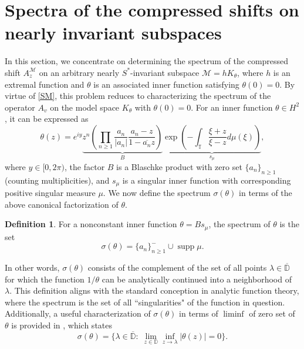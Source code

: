 \documentclass[12pt,reqno]{amsart}
\theoremstyle{definition}
\newtheorem{defn}[thm]{Definition}
\theoremstyle{remark}
\numberwithin{equation}{section}
\newcommand{\ol}{\overline}
\newcommand{\ma}{\mathcal}
\begin{document}
\section{Spectra   of the compressed shifts on nearly invariant subspaces}
In this section, we concentrate on determining the spectrum of the compressed shift $A_z^\ma{M}$ on an arbitrary nearly $S^*$-invariant subspace $\ma{M}=hK_\theta$, where  $h$ is an extremal function and $\theta$ is an associated inner function  satisfying $\theta(0)=0$. By virtue of \eqref{SM}, this problem reduces to characterizing the spectrum of the operator $A_v$ on the model space $K_\theta$ with $\theta(0)=0$.  For an inner function \( \theta\in H^2\), it can be expressed as
\[\theta(z) = e^{iy}
\underbrace{z^n
  \left( \prod_{n \geq 1} \frac{a_n}{|a_n|} \frac{a_n - z}{1 - \overline{a_n} z} \right)
}_{B}
\underbrace{
  \exp \left( -\int_{\mathbb{T}} \frac{\xi + z}{\xi - z} d\mu(\xi) \right)
}_{s_\mu}, \]
where \( y \in [0, 2\pi) \), the  factor \( B \) is a Blaschke product with zero set \(\{a_n\}_{n \geq 1}\) (counting multiplicities), and  \( s_\mu \) is a singular inner function with corresponding positive singular measure \( \mu \).  We now define   the spectrum $\sigma(\theta)$
in terms of the above canonical factorization of $\theta$.

\begin{defn}
For a nonconstant inner function \( \theta = Bs_\mu \), the spectrum of \(\theta \) is the set
\[
\sigma(\theta) = \{a_n\}_{n \geq 1}^- \cup \operatorname{supp} \mu.
\]
\end{defn}
In other words, $\sigma(\theta)$  consists of the complement of the set of all points $\lambda\in \ol{\mathbb{D}}$ for which the function $1/\theta$ can be analytically continued into a neighborhood of $\lambda.$ This definition aligns with the standard conception in analytic function theory, where the spectrum is the set of all ``singularities" of the function in question.  Additionally, a useful characterization of $\sigma(\theta)$ in terms of $\liminf$ of zero set of $\theta$ is provided in \cite[Proposition 7.19]{GMR}, which states $$\sigma(\theta)=\{\lambda\in \ol{\mathbb{D}}:\;\lim_{z\in \mathbb{D}}\inf_{z\rightarrow \lambda}|\theta(z)|=0\}.$$
\end{document}
